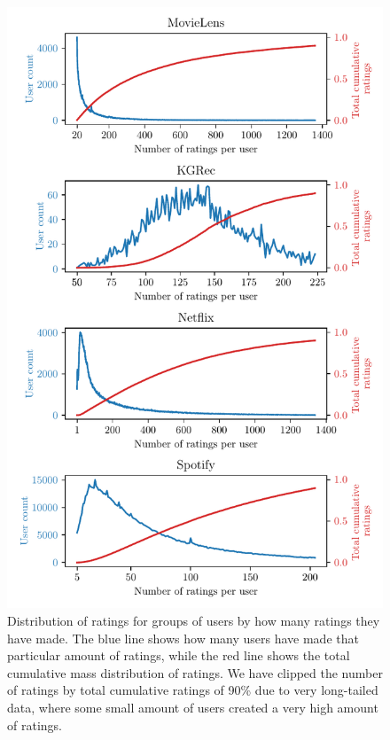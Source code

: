 \begin{figure}[htbp!]
    \centering
    \includegraphics{img/figures/num_users_by_rating_count.pdf}
    \caption[Distribution of ratings]{Distribution of ratings for groups of users by how many ratings they have made. The blue line shows how many users have made that particular amount of ratings, while the red line shows the total cumulative mass distribution of ratings. We have clipped the number of ratings by total cumulative ratings of 90\% due to very long-tailed data, where some small amount of users created a very high amount of ratings.}
    \label{fig:datasets_num_ratings}
\end{figure}

